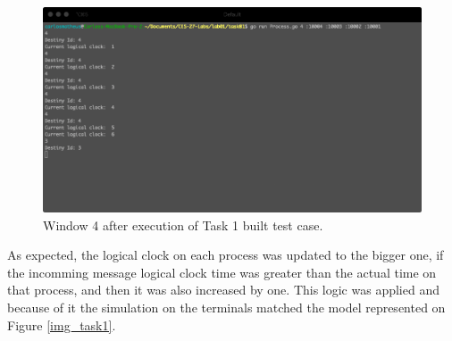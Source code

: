 \documentclass[a4paper, 11pt]{article}
\begin{document}
\begin{figure}[h]
  \begin{center}
  \includegraphics[width=4.5in]{./imgs/task1_buit_test_window4.png}
  \caption{Window 4 after execution of Task 1 built test case.}
  \label{img_task1_built_case_window4}
  \end{center}
\end{figure}


As expected, the logical clock on each process was updated to the bigger one, if the incomming message logical clock time was greater than the actual time on that process, and then it was also increased by one. This logic was applied and because of it the simulation on the terminals matched the model represented on Figure \ref{img_task1}.


% 
% 
\end{document}
